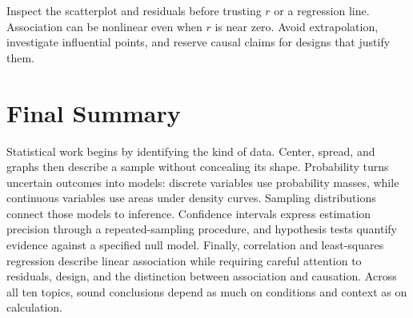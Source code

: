 \documentclass[11pt]{article}
\begin{document}
\begin{keybox}
Inspect the scatterplot and residuals before trusting $r$ or a regression
line.  Association can be nonlinear even when $r$ is near zero.  Avoid
extrapolation, investigate influential points, and reserve causal claims for
designs that justify them.
\end{keybox}

\section*{Final Summary}
Statistical work begins by identifying the kind of data.  Center, spread,
and graphs then describe a sample without concealing its shape.  Probability
turns uncertain outcomes into models: discrete variables use probability
masses, while continuous variables use areas under density curves.  Sampling
distributions connect those models to inference.  Confidence intervals
express estimation precision through a repeated-sampling procedure, and
hypothesis tests quantify evidence against a specified null model.  Finally,
correlation and least-squares regression describe linear association while
requiring careful attention to residuals, design, and the distinction between
association and causation.  Across all ten topics, sound conclusions depend
as much on conditions and context as on calculation.
\end{document}
